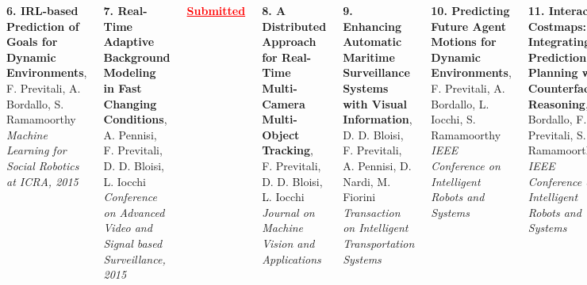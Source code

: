 \begin{frame}
\begin{columns}[t]
		\vspace{0.15cm}
		
		\textbf{6. IRL-based Prediction of Goals for Dynamic Environments}, F. Previtali, A. Bordallo,
		S. Ramamoorthy \\
		\emph{Machine Learning for Social Robotics at ICRA, 2015}
		
		
		\vspace{0.34cm}
		
		\tiny
		
		\textbf{7. Real-Time Adaptive Background Modeling in Fast Changing Conditions}, A. Pennisi, F.
		Previtali, D. D. Bloisi, L. Iocchi \\
		\emph{Conference on Advanced Video and Signal based Surveillance, 2015}
		
		\vspace{0.2cm}
		
		\textcolor{red}{\textbf{\underline{Submitted}}}
		
		\vspace{0.1cm}
		
		\textbf{8. A Distributed Approach for Real-Time Multi-Camera Multi-Object Tracking}, F.
		Previtali, D. D. Bloisi, L. Iocchi \\
		\emph{Journal on Machine Vision and Applications}
		
		\vspace{0.15cm}
		
		\textbf{9. Enhancing Automatic Maritime Surveillance Systems with Visual Information}, D. D.
		Bloisi, F. Previtali, A. Pennisi, D. Nardi, M. Fiorini \\
		\emph{Transaction on Intelligent Transportation Systems}
		
		\vspace{0.15cm}
		
		\textbf{10. Predicting Future Agent Motions for Dynamic Environments}, F. Previtali, A.
		Bordallo, L. Iocchi, S. Ramamoorthy \\
		\emph{IEEE Conference on Intelligent Robots and Systems}
		
		\vspace{0.15cm}
		
		\textbf{11. Interactive Costmaps: Integrating Prediction and Planning with Counterfactual
		Reasoning}, A. Bordallo, F. Previtali, S. Ramamoorthy \\
		\emph{IEEE Conference on Intelligent Robots and Systems}
	\end{columns}
	
	
\end{frame}
